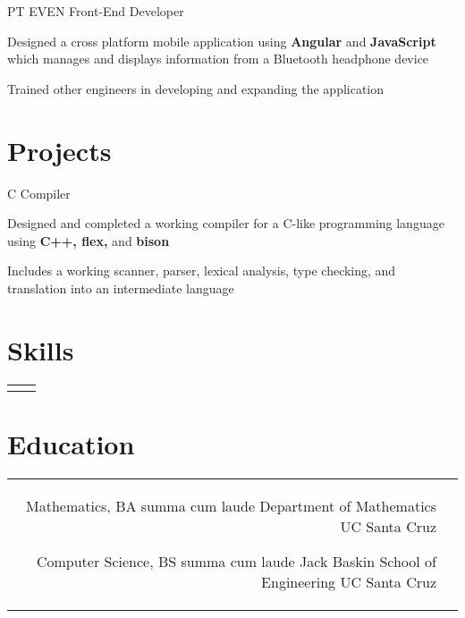 \documentclass[10pt]{article}
\begin{document}
\begin{paracol}{2}
{PT}
{EVEN}
{}
{Front-End Developer}
{}
{
\item Designed a cross platform mobile application using \textbf{Angular}
  and \textbf{JavaScript} which manages and displays information from a Bluetooth
  headphone device
\item Trained other engineers in developing and expanding the application
}

\vspace{-\baselineskip}\medskip

\switchcolumn

\section{Projects}

{}{}{}
{C Compiler}{}
{
  \item Designed and completed a working compiler for a C-like programming language
    using \textbf{C++, flex,} and \textbf{bison}
  \item Includes a working scanner, parser, lexical analysis, type checking,
    and translation in\-to an intermediate language
}

\section{Skills}
\begin{supertabular}{rl}


\end{supertabular}

\section{Education}

\begin{supertabular}{rl}
	{Mathematics, BA}
	{summa cum laude}
    {Department of Mathematics}
	{UC Santa Cruz}

    {Computer Science, BS}
    {summa cum laude}
    {Jack Baskin School of Engineering}
    {UC Santa Cruz}

\end{supertabular}

\end{paracol}
\end{document}
